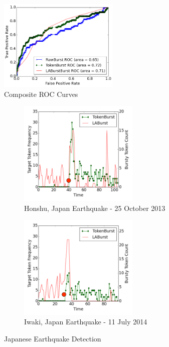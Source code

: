 \documentclass[letterpaper]{article}
\begin{document}
\begin{figure}[htbp]
\begin{center}
\includegraphics[width=2.25in]{./figures/roc_Comp.png}
\caption{Composite ROC Curves}
\label{fig:rocComprehensive}
\end{center}
\end{figure}

\begin{figure}[hbtp]
\centering
\begin{subfigure}[b]{0.4\textwidth}
\includegraphics[width=2.25in]{./figures/2013-japan-quake.png}
\caption{Honshu, Japan Earthquake - 25 October 2013}
\label{fig:2013Japan}
\end{subfigure}
\begin{subfigure}[b]{0.4\textwidth}
\includegraphics[width=2.25in]{./figures/2014-japan-quake.png}
\caption{Iwaki, Japan Earthquake - 11 July 2014}
\label{fig:2014Japan}
\end{subfigure}
\caption{Japanese Earthquake Detection}
\label{fig:joinedEarthquake}
\end{figure}
\end{document}
